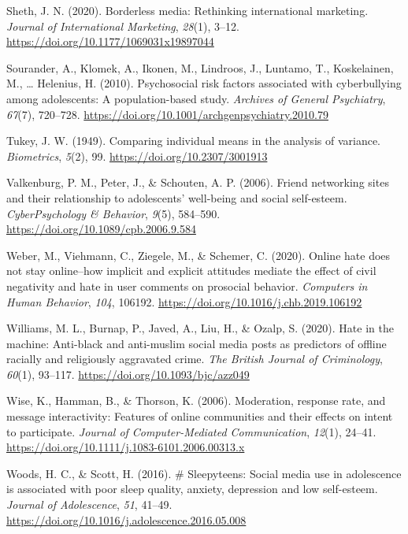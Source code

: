 \documentclass[10pt,dvipsnames]{scrartcl}
\begin{document}
\hypertarget{ref-sheth2020borderless}{}
Sheth, J. N. (2020). Borderless media: Rethinking international
marketing. \emph{Journal of International Marketing}, \emph{28}(1),
3--12. \url{https://doi.org/10.1177/1069031x19897044}

\hypertarget{ref-sourander2010psychosocial}{}
Sourander, A., Klomek, A., Ikonen, M., Lindroos, J., Luntamo, T.,
Koskelainen, M., \ldots{} Helenius, H. (2010). Psychosocial risk factors
associated with cyberbullying among adolescents: A population-based
study. \emph{Archives of General Psychiatry}, \emph{67}(7), 720--728.
\url{https://doi.org/10.1001/archgenpsychiatry.2010.79}

\hypertarget{ref-Tukey1949}{}
Tukey, J. W. (1949). Comparing individual means in the analysis of
variance. \emph{Biometrics}, \emph{5}(2), 99.
\url{https://doi.org/10.2307/3001913}

\hypertarget{ref-valkenburg2006friend}{}
Valkenburg, P. M., Peter, J., \& Schouten, A. P. (2006). Friend
networking sites and their relationship to adolescents' well-being and
social self-esteem. \emph{CyberPsychology \& Behavior}, \emph{9}(5),
584--590. \url{https://doi.org/10.1089/cpb.2006.9.584}

\hypertarget{ref-weber2020online}{}
Weber, M., Viehmann, C., Ziegele, M., \& Schemer, C. (2020). Online hate
does not stay online--how implicit and explicit attitudes mediate the
effect of civil negativity and hate in user comments on prosocial
behavior. \emph{Computers in Human Behavior}, \emph{104}, 106192.
\url{https://doi.org/10.1016/j.chb.2019.106192}

\hypertarget{ref-williams2020hate}{}
Williams, M. L., Burnap, P., Javed, A., Liu, H., \& Ozalp, S. (2020).
Hate in the machine: Anti-black and anti-muslim social media posts as
predictors of offline racially and religiously aggravated crime.
\emph{The British Journal of Criminology}, \emph{60}(1), 93--117.
\url{https://doi.org/10.1093/bjc/azz049}

\hypertarget{ref-wise2006moderation}{}
Wise, K., Hamman, B., \& Thorson, K. (2006). Moderation, response rate,
and message interactivity: Features of online communities and their
effects on intent to participate. \emph{Journal of Computer-Mediated
Communication}, \emph{12}(1), 24--41.
\url{https://doi.org/10.1111/j.1083-6101.2006.00313.x}

\hypertarget{ref-woods2016sleepyteens}{}
Woods, H. C., \& Scott, H. (2016). \# Sleepyteens: Social media use in
adolescence is associated with poor sleep quality, anxiety, depression
and low self-esteem. \emph{Journal of Adolescence}, \emph{51}, 41--49.
\url{https://doi.org/10.1016/j.adolescence.2016.05.008}
\end{document}
